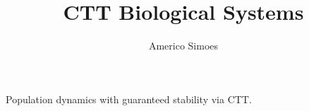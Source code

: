 \documentclass[12pt]{article}
\begin{document}
\title{CTT Biological Systems}
\author{Americo Simoes}
\maketitle
Population dynamics with guaranteed stability via CTT.
\end{document}
